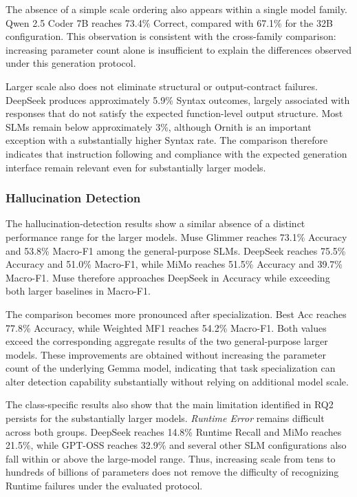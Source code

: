 The absence of a simple scale ordering also appears within a single model family. Qwen 2.5 Coder 7B reaches 73.4\% Correct, compared with 67.1\% for the 32B configuration. This observation is consistent with the cross-family comparison: increasing parameter count alone is insufficient to explain the differences observed under this generation protocol.

Larger scale also does not eliminate structural or output-contract failures. DeepSeek produces approximately 5.9\% Syntax outcomes, largely associated with responses that do not satisfy the expected function-level output structure. Most SLMs remain below approximately 3\%, although Ornith is an important exception with a substantially higher Syntax rate. The comparison therefore indicates that instruction following and compliance with the expected generation interface remain relevant even for substantially larger models.

\subsubsection{Hallucination Detection}

The hallucination-detection results show a similar absence of a distinct performance range for the larger models. Muse Glimmer reaches 73.1\% Accuracy and 53.8\% Macro-F1 among the general-purpose SLMs. DeepSeek reaches 75.5\% Accuracy and 51.0\% Macro-F1, while MiMo reaches 51.5\% Accuracy and 39.7\% Macro-F1. Muse therefore approaches DeepSeek in Accuracy while exceeding both larger baselines in Macro-F1.

The comparison becomes more pronounced after specialization. Best Acc reaches 77.8\% Accuracy, while Weighted MF1 reaches 54.2\% Macro-F1. Both values exceed the corresponding aggregate results of the two general-purpose larger models. These improvements are obtained without increasing the parameter count of the underlying Gemma model, indicating that task specialization can alter detection capability substantially without relying on additional model scale.

The class-specific results also show that the main limitation identified in RQ2 persists for the substantially larger models. \emph{Runtime Error} remains difficult across both groups. DeepSeek reaches 14.8\% Runtime Recall and MiMo reaches 21.5\%, while GPT-OSS reaches 32.9\% and several other SLM configurations also fall within or above the large-model range. Thus, increasing scale from tens to hundreds of billions of parameters does not remove the difficulty of recognizing Runtime failures under the evaluated protocol.

